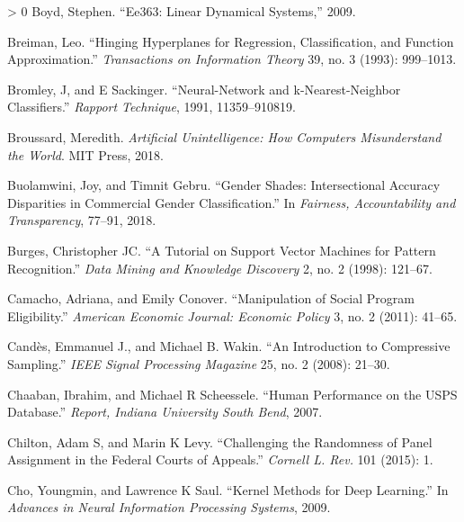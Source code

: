 \documentclass{tufte-book}
\newlength{\cslhangindent}
\newenvironment{CSLReferences}[3] %
 {%
  \setlength{\parindent}{0pt}
  \ifodd #1 \everypar{\setlength{\hangindent}{\cslhangindent}}\ignorespaces\fi
  \ifnum #2 > 0
  \setlength{\parskip}{#3\baselineskip}
  \fi
 }%
 {
 }
\begin{document}
\begin{CSLReferences}{1}{0}
\leavevmode\hypertarget{ref-BoydOCNotes}{}%
Boyd, Stephen. {``{Ee363}: Linear Dynamical Systems,''} 2009.

\leavevmode\hypertarget{ref-breiman1993hinging}{}%
Breiman, Leo. {``Hinging Hyperplanes for Regression, Classification, and
Function Approximation.''} \emph{Transactions on Information Theory} 39,
no. 3 (1993): 999--1013.

\leavevmode\hypertarget{ref-bromley1991neural}{}%
Bromley, J, and E Sackinger. {``Neural-Network and k-Nearest-Neighbor
Classifiers.''} \emph{Rapport Technique}, 1991, 11359--910819.

\leavevmode\hypertarget{ref-broussard2018artificial}{}%
Broussard, Meredith. \emph{Artificial Unintelligence: How Computers
Misunderstand the World}. MIT Press, 2018.

\leavevmode\hypertarget{ref-buolamwini2018gender}{}%
Buolamwini, Joy, and Timnit Gebru. {``Gender Shades: Intersectional
Accuracy Disparities in Commercial Gender Classification.''} In
\emph{Fairness, Accountability and Transparency}, 77--91, 2018.

\leavevmode\hypertarget{ref-burges1998tutorial}{}%
Burges, Christopher JC. {``A Tutorial on Support Vector Machines for
Pattern Recognition.''} \emph{Data Mining and Knowledge Discovery} 2,
no. 2 (1998): 121--67.

\leavevmode\hypertarget{ref-camacho2011manipulation}{}%
Camacho, Adriana, and Emily Conover. {``Manipulation of Social Program
Eligibility.''} \emph{American Economic Journal: Economic Policy} 3, no.
2 (2011): 41--65.

\leavevmode\hypertarget{ref-candes2008introduction}{}%
Candès, Emmanuel J., and Michael B. Wakin. {``An Introduction to
Compressive Sampling.''} \emph{{IEEE} Signal Processing Magazine} 25,
no. 2 (2008): 21--30.

\leavevmode\hypertarget{ref-chaaban2007human}{}%
Chaaban, Ibrahim, and Michael R Scheessele. {``Human Performance on the
USPS Database.''} \emph{Report, Indiana University South Bend}, 2007.

\leavevmode\hypertarget{ref-chilton2015challenging}{}%
Chilton, Adam S, and Marin K Levy. {``Challenging the Randomness of
Panel Assignment in the Federal Courts of Appeals.''} \emph{Cornell L.
Rev.} 101 (2015): 1.

\leavevmode\hypertarget{ref-Cho09}{}%
Cho, Youngmin, and Lawrence K Saul. {``Kernel Methods for Deep
Learning.''} In \emph{Advances in Neural Information Processing
Systems}, 2009.


\end{CSLReferences}
\end{document}

